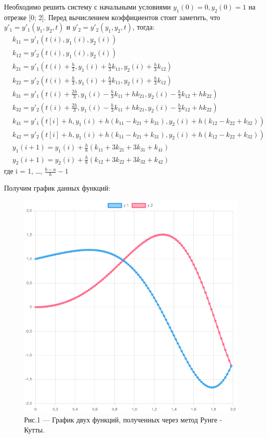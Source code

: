 \documentclass[a4paper,12pt]{article}
\begin{document}
Необходимо решить систему с начальными условиями $y_1(0) = 0, y_2(0) = 1$ на отрезке [0; 2].
Перед вычислением коэффициентов стоит заметить, что $y'_1 = y'_1(y_1, y_2, t)$ и $y'_2 = y'_2(y_1, y_2, t)$,
тогда:
\begin{align}
    &k_{11} = y'_1(t(i), y_1(i), y_2(i)) \nonumber \\
    &k_{12} = y'_2(t(i), y_1(i), y_2(i)) \nonumber \\
    &k_{21} = y'_1(t(i) + \frac{h}{3}, y_1(i) + \frac{h}{3}k_{11}, y_2(i) + \frac{h}{3} k_{12}) \nonumber \\
    &k_{22} = y'_2(t(i) + \frac{h}{3}, y_1(i) + \frac{h}{3}k_{11}, y_2(i) + \frac{h}{3} k_{12}) \nonumber \\
    &k_{31} = y'_1(t(i) + \frac{2h}{3}, y_1(i) - \frac{h}{3}k_{11} + hk_{21}, y_2(i) - \frac{h}{3}k_{12} + hk_{22}) \\
    &k_{32} = y'_2(t(i) + \frac{2h}{3}, y_1(i) - \frac{h}{3}k_{11} + hk_{21}, y_2(i) - \frac{h}{3}k_{12} + hk_{22}) \nonumber \\
    &k_{41} = y'_1(t[i] + h, y_1(i) + h (k_{11} - k_{21} + k_{31}), y_2(i) + h(k_{12} - k_{22} + k_{32})) \nonumber \\
    &k_{42} = y'_2(t[i] + h, y_1(i) + h (k_{11} - k_{21} + k_{31}), y_2(i) + h(k_{12} - k_{22} + k_{32})) \nonumber \\
    &y_1(i + 1) = y_1(i) + \frac{h}{8} (k_{11} + 3k_{21} + 3k_{31} + k_{41}) \nonumber \\
    &y_2(i + 1) = y_2(i) + \frac{h}{8} (k_{12} + 3k_{22} + 3k_{32} + k_{42}) \nonumber 
\end{align}
где i = 1, \dots, $\frac{b-a}{h} - 1$

Получим график данных функций:
\begin{figure}[h]
    \centering
    \includegraphics[width=0.5\linewidth]{pictures/testTaskResult.png}
    \captionsetup{labelformat=empty}
    \caption{Рис.1 --- График двух функций, полученных через метод Рунге - Кутты.}
\end{figure}
\newpage
\end{document}
